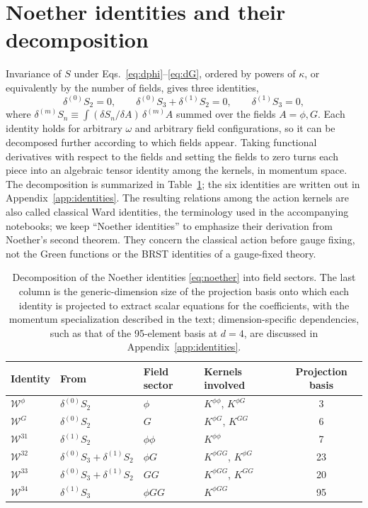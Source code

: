 \documentclass[prd,aps,preprint,superscriptaddress,nofootinbib,amsmath,amssymb,eqsecnum]{revtex4-2}
\newcommand{\W}{\mathcal{W}}
\begin{document}
\section{Noether identities and their decomposition}
\label{sec:identities}

Invariance of $S$ under Eqs.~\eqref{eq:dphi}--\eqref{eq:dG}, ordered by powers of
$\kappa$, or equivalently by the number of fields, gives three identities,
\begin{equation}
\delta^{(0)}S_2=0,\qquad
\delta^{(0)}S_3+\delta^{(1)}S_2=0,\qquad
\delta^{(1)}S_3=0,
\label{eq:noether}
\end{equation}
where $\delta^{(m)}S_n\equiv\int(\delta S_n/\delta A)\,\delta^{(m)}A$ summed over the
fields $A=\phi,G$. Each identity holds for arbitrary $\omega$ and arbitrary field
configurations, so it can be decomposed further according to which fields appear. Taking
functional derivatives with respect to the fields and setting the fields to zero turns each
piece into an algebraic tensor identity among the kernels, in momentum space. The
decomposition is summarized in Table~\ref{tab:identities}; the six identities are written out
in Appendix~\ref{app:identities}. The resulting relations among the action kernels are also
called classical Ward identities, the terminology used in the accompanying notebooks; we
keep ``Noether identities'' to emphasize their derivation from Noether's second theorem.
They concern the classical action before gauge fixing, not the Green functions or the BRST
identities of a gauge-fixed theory.

\begin{table}[htb]
\centering
\begin{tabular}{@{}llllc@{}}
\toprule
Identity & From & Field sector & Kernels involved & Projection basis \\
\midrule
$\W^{\phi}$  & $\delta^{(0)}S_2$ & $\phi$   & $K^{\phi\phi}$, $K^{\phi G}$ & 3 \\
$\W^{G}$     & $\delta^{(0)}S_2$ & $G$      & $K^{\phi G}$, $K^{GG}$ & 6 \\
$\W^{31}$    & $\delta^{(1)}S_2$ & $\phi\phi$ & $K^{\phi\phi}$ & 7 \\
$\W^{32}$    & $\delta^{(0)}S_3+\delta^{(1)}S_2$ & $\phi G$ & $K^{\phi GG}$, $K^{\phi G}$ & 23 \\
$\W^{33}$    & $\delta^{(0)}S_3+\delta^{(1)}S_2$ & $GG$ & $K^{\phi GG}$, $K^{GG}$ & 20 \\
$\W^{34}$    & $\delta^{(1)}S_3$ & $\phi GG$ & $K^{\phi GG}$ & 95 \\
\bottomrule
\end{tabular}
\caption{Decomposition of the Noether identities \eqref{eq:noether} into field sectors. The
last column is the generic-dimension size of the projection basis onto which each identity
is projected to extract scalar equations for the coefficients, with the momentum
specialization described in the text; dimension-specific dependencies, such as that of the
95-element basis at $d=4$, are discussed in Appendix~\ref{app:identities}.}
\label{tab:identities}
\end{table}
\end{document}
